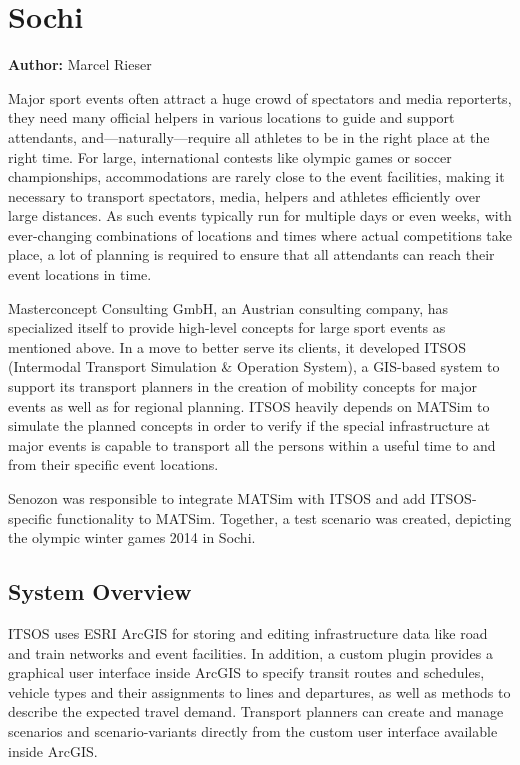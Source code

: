 \section{Sochi}
\label{ch:scenarios:sochi}
\hfill \textbf{Author:} Marcel Rieser


Major sport events often attract a huge crowd of spectators and media
reporterts, they need many official helpers in various locations to guide and
support attendants, and---naturally---require all athletes to be in
the right place at the right time.  For large, international contests like
olympic games or soccer championships, accommodations are rarely close to the
event facilities, making it necessary to transport spectators, media, helpers
and athletes efficiently over large distances. As such events typically run for
multiple days or even weeks, with ever-changing combinations of locations and
times where actual competitions take place, a lot of planning is required to
ensure that all attendants can reach their event locations in time.

Masterconcept Consulting GmbH, an Austrian consulting company, has specialized
itself to provide high-level concepts for large sport events as mentioned above.  In a
move to better serve its clients, it developed ITSOS (Intermodal Transport
Simulation \& Operation System), a GIS-based system to support its transport
planners in the creation of mobility concepts for major events as well as for
regional planning.  ITSOS heavily depends on MATSim to simulate the planned
concepts in order to verify if the special infrastructure at major events is
capable to transport all the persons within a useful time to and from
their specific event locations.

Senozon was responsible to integrate MATSim with ITSOS and add ITSOS-specific
functionality to MATSim. Together, a test scenario was created, depicting the
olympic winter games 2014 in Sochi.



\subsection{System Overview}

ITSOS uses ESRI ArcGIS for storing and editing infrastructure data like road
and train networks and event facilities. In addition, a custom plugin provides a
graphical user interface inside ArcGIS to specify transit routes and schedules,
vehicle types and their assignments to lines and departures, as well as methods
to describe the expected travel demand. Transport planners can create and manage
scenarios and scenario-variants directly from the custom user interface
available inside ArcGIS.

